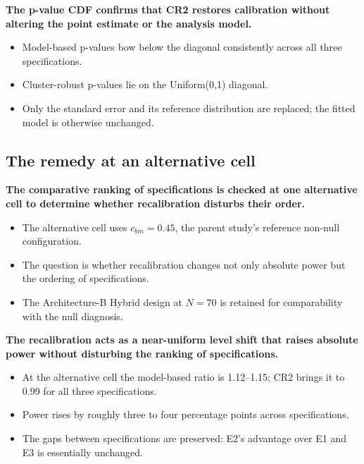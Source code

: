 \documentclass[
  11pt,
]{article}
\begin{document}
\textbf{The p-value CDF confirms that CR2 restores calibration without altering the point estimate or the analysis model.}

\begin{itemize}\setlength{\itemsep}{2pt}\setlength{\parskip}{0pt}
\item Model-based p-values bow below the diagonal consistently across all three specifications.
\item Cluster-robust p-values lie on the Uniform(0,1) diagonal.
\item Only the standard error and its reference distribution are replaced; the fitted model is otherwise unchanged.
\end{itemize}

\subsection{The remedy at an alternative cell}\label{the-remedy-at-an-alternative-cell}

\textbf{The comparative ranking of specifications is checked at one alternative cell to determine whether recalibration disturbs their order.}

\begin{itemize}\setlength{\itemsep}{2pt}\setlength{\parskip}{0pt}
\item The alternative cell uses $c_{bm} = 0.45$, the parent study's reference non-null configuration.
\item The question is whether recalibration changes not only absolute power but the ordering of specifications.
\item The Architecture-B Hybrid design at $N = 70$ is retained for comparability with the null diagnosis.
\end{itemize}

\textbf{The recalibration acts as a near-uniform level shift that raises absolute power without disturbing the ranking of specifications.}

\begin{itemize}\setlength{\itemsep}{2pt}\setlength{\parskip}{0pt}
\item At the alternative cell the model-based ratio is 1.12--1.15; CR2 brings it to 0.99 for all three specifications.
\item Power rises by roughly three to four percentage points across specifications.
\item The gaps between specifications are preserved: E2's advantage over E1 and E3 is essentially unchanged.
\end{itemize}
\end{document}
